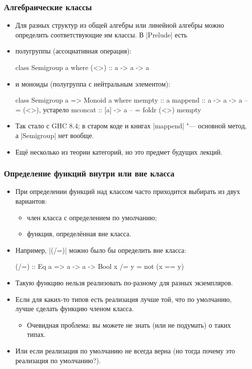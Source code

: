\documentclass[10pt]{beamer}
\begin{document}
\begin{frame}[fragile]
  \frametitle{Алгебраические классы}
  \begin{itemize}
    \item Для разных структур из общей алгебры или линейной алгебры можно определить соответствующие им классы. В \haskinline|Prelude| есть
    \item полугруппы (ассоциативная операция):
          \begin{haskell}
            class Semigroup a where
                (<>) :: a -> a -> a
          \end{haskell}
    \item и моноиды (полугруппа с нейтральным элементом):
          \begin{haskell}
            class Semigroup a => Monoid a where
                mempty :: a
                mappend :: a -> a -> a -- = (<>), устарело
                mconcat :: [a] -> a    -- = foldr (<>) mempty
          \end{haskell}
    \item Так стало с GHC 8.4; в старом коде и книгах \haskinline|mappend| "--- основной метод, а \haskinline|Semigroup| нет вообще. \pause
    \item Ещё несколько из теории категорий, но это предмет будущих лекций.
  \end{itemize}
\end{frame}

\begin{frame}[fragile]
  \frametitle{Определение функций внутри или вне класса}
  \begin{itemize}
    \item При определении функций над классом часто приходится выбирать из двух вариантов:
          \begin{itemize}
            \item член класса с определением по умолчанию;
            \item функция, определённая вне класса.
          \end{itemize}
    \item Например, \haskinline|(/=)| можно было бы определить вне класса:
          \begin{haskell}
            (/=) :: Eq a => a -> a -> Bool
            x /= y = not (x == y)
          \end{haskell}
          \pause
    \item Такую функцию нельзя реализовать по-разному для разных экземпляров.\pause
    \item Если для каких-то типов есть реализация лучше той, что по умолчанию, лучше сделать функцию членом класса.
          \pause
          \begin{itemize}
            \item Очевидная проблема: вы можете не знать (или не подумать) о таких типах.
          \end{itemize}
          \pause
    \item Или если реализация по умолчанию не всегда верна \pause(но тогда почему это реализация по умолчанию?).
  \end{itemize}
\end{frame}
\end{document}
